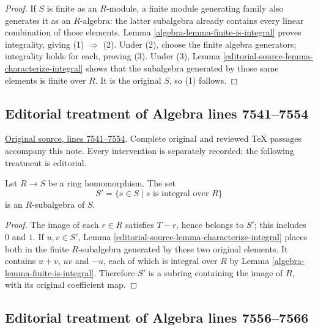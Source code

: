 \begin{proof}
If $S$ is finite as an $R$-module, a finite module generating
family also generates it as an $R$-algebra: the latter subalgebra
already contains every linear combination of those elements.
Lemma \ref{algebra-lemma-finite-is-integral} proves integrality, giving
(1) $\Rightarrow$ (2). Under (2), choose the finite algebra
generators; integrality holds for each, proving (3).
Under (3), Lemma \ref{editorial-source-lemma-characterize-integral} shows that the
subalgebra generated by those same elements is finite over $R$.
It is the original $S$, so (1) follows.
\end{proof}


\subsection{Editorial treatment of Algebra lines 7541--7554}

\hypertarget{algebra-context-072}{}

\noindent\href{https://github.com/stacks/stacks-project/blob/a04446e57ec1fbc252a871afcec7752fb2807b14/algebra.tex\#L7541}{Original source, lines 7541--7554}. Complete original and reviewed TeX passages accompany this note. Every intervention is separately recorded; the following treatment is editorial.


\begin{lemma}
\label{editorial-source-lemma-integral-closure-is-ring}
Let $R \to S$ be a ring homomorphism.
The set
$$
S' = \{s \in S \mid s\text{ is integral over }R\}
$$
is an $R$-subalgebra of $S$.
\end{lemma}

\begin{proof}
The image of each $r\in R$ satisfies $T-r$, hence belongs to $S'$;
this includes $0$ and $1$. If $u,v\in S'$,
Lemma \ref{editorial-source-lemma-characterize-integral} places both in the finite
$R$-subalgebra generated by these two original elements. It contains
$u+v$, $uv$ and $-u$, each of which is integral over $R$ by
Lemma \ref{algebra-lemma-finite-is-integral}. Therefore $S'$ is a subring
containing the image of $R$, with its original coefficient map.
\end{proof}


\subsection{Editorial treatment of Algebra lines 7556--7566}

\hypertarget{algebra-context-073}{}

